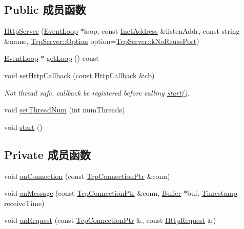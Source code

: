 \subsection*{Public 成员函数}
\begin{DoxyCompactItemize}
\item 
\hyperlink{classmuduo_1_1net_1_1HttpServer_a497e7b9c047a6b99d3727de450774988}{Http\+Server} (\hyperlink{classmuduo_1_1net_1_1EventLoop}{Event\+Loop} $\ast$loop, const \hyperlink{classmuduo_1_1net_1_1InetAddress}{Inet\+Address} \&listen\+Addr, const string \&name, \hyperlink{classmuduo_1_1net_1_1TcpServer_a0e65ad13124ea2cb5e255b640464e35f}{Tcp\+Server\+::\+Option} option=\hyperlink{classmuduo_1_1net_1_1TcpServer_a0e65ad13124ea2cb5e255b640464e35fa5ddf56db99b3883a1c729e8b6873bbf5}{Tcp\+Server\+::k\+No\+Reuse\+Port})
\item 
\hyperlink{classmuduo_1_1net_1_1EventLoop}{Event\+Loop} $\ast$ \hyperlink{classmuduo_1_1net_1_1HttpServer_aef1cbfe0592e8196e6c81b4db82a39ce}{get\+Loop} () const
\item 
void \hyperlink{classmuduo_1_1net_1_1HttpServer_ac46810c8853d92daeea2753cc270dccb}{set\+Http\+Callback} (const \hyperlink{classmuduo_1_1net_1_1HttpServer_ab343d6a3f751b7fb50940f92c64b6578}{Http\+Callback} \&cb)
\begin{DoxyCompactList}\small\item\em Not thread safe, callback be registered before calling \hyperlink{classmuduo_1_1net_1_1HttpServer_a60de64d75454385b23995437f1d72669}{start()}. \end{DoxyCompactList}\item 
void \hyperlink{classmuduo_1_1net_1_1HttpServer_a83bb28d139df96ba9fc449b4643f2c36}{set\+Thread\+Num} (int num\+Threads)
\item 
void \hyperlink{classmuduo_1_1net_1_1HttpServer_a60de64d75454385b23995437f1d72669}{start} ()
\end{DoxyCompactItemize}
\subsection*{Private 成员函数}
\begin{DoxyCompactItemize}
\item 
void \hyperlink{classmuduo_1_1net_1_1HttpServer_ae085355191b9979cba83ee65fb969fcb}{on\+Connection} (const \hyperlink{namespacemuduo_1_1net_ab91a46e9290926aa692450e46cfc9039}{Tcp\+Connection\+Ptr} \&conn)
\item 
void \hyperlink{classmuduo_1_1net_1_1HttpServer_affde82cb1aeae31f8ce39103fa4cd358}{on\+Message} (const \hyperlink{namespacemuduo_1_1net_ab91a46e9290926aa692450e46cfc9039}{Tcp\+Connection\+Ptr} \&conn, \hyperlink{classmuduo_1_1net_1_1Buffer}{Buffer} $\ast$buf, \hyperlink{classmuduo_1_1Timestamp}{Timestamp} receive\+Time)
\item 
void \hyperlink{classmuduo_1_1net_1_1HttpServer_a39f88c74f26fed6e5d98de09075f4c1b}{on\+Request} (const \hyperlink{namespacemuduo_1_1net_ab91a46e9290926aa692450e46cfc9039}{Tcp\+Connection\+Ptr} \&, const \hyperlink{classmuduo_1_1net_1_1HttpRequest}{Http\+Request} \&)
\end{DoxyCompactItemize}

